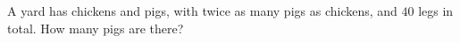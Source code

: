 A yard has chickens and pigs, with twice as many pigs as chickens, and $40$ legs in total. How many pigs are there?
